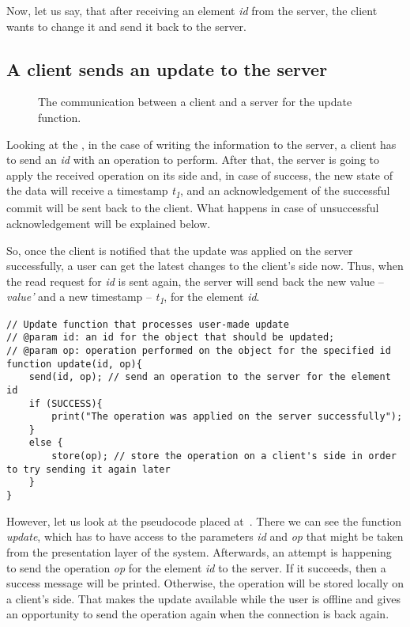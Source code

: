 Now, let us say, that after receiving an element \textit{id} from the server, the client wants to change it and send it back to the server.

\subsection*{A client sends an update to the server}

\begin{figure}[!htb]
    \begin{center}
    \def\svgwidth{\linewidth}
    
    \caption {The communication between a client and a server for the update function.}
    \label{fig:design3}
\end{center}
\end{figure}

Looking at the , in the case of writing the information to the server, a client has to send an \textit{id} with an operation to perform. After that, the server is going to apply the received operation on its side and, in case of success, the new state of the data will receive a timestamp \textit{t\textsubscript{1}}, and an acknowledgement of the successful commit will be sent back to the client. What happens in case of unsuccessful acknowledgement will be explained below. 

So, once the client is notified that the update was applied on the server successfully, a user can get the latest changes to the client's side now. Thus, when the read request for \textit{id} is sent again, the server will send back the new value -- \textit{value'} and a new timestamp -- \textit{t\textsubscript{1}}, for the element \textit{id}.

\begin{lstlisting}[caption={Pseudocode for making a request to change the data: client.}, label={lst:update1}]
// Update function that processes user-made update
// @param id: an id for the object that should be updated;
// @param op: operation performed on the object for the specified id
function update(id, op){
    send(id, op); // send an operation to the server for the element id
    if (SUCCESS){
        print("The operation was applied on the server successfully"); 
    }
    else {
        store(op); // store the operation on a client's side in order to try sending it again later
    }
}
\end{lstlisting} 

However, let us look at the pseudocode placed at~. There we can see the function \textit{update}, which has to have access to the parameters \textit{id} and \textit{op} that might be taken from the presentation layer of the system. Afterwards, an attempt is happening to send the operation \textit{op} for the element \textit{id} to the server. If it succeeds, then a success message will be printed. Otherwise, the operation will be stored locally on a client's side. That makes the update available while the user is offline and gives an opportunity to send the operation again when the connection is back again.

